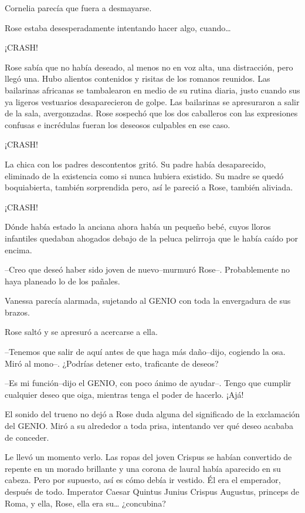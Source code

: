 Cornelia parecía que fuera a desmayarse.

Rose estaba desesperadamente intentando hacer algo, cuando\ldots{}

¡CRASH!

Rose sabía que no había deseado, al menos no en voz alta, una
distracción, pero llegó una. Hubo alientos contenidos y risitas de los
romanos reunidos. Las bailarinas africanas se tambalearon en medio de su
rutina diaria, justo cuando sus ya ligeros vestuarios desaparecieron de
golpe. Las bailarinas se apresuraron a salir de la sala, avergonzadas.
Rose sospechó que los dos caballeros con las expresiones confusas e
incrédulas fueran los deseosos culpables en ese caso.

¡CRASH!

La chica con los padres descontentos gritó. Su padre había desaparecido,
eliminado de la existencia como si nunca hubiera existido. Su madre se
quedó boquiabierta, también sorprendida pero, así le pareció a Rose,
también aliviada.

¡CRASH!

Dónde había estado la anciana ahora había un pequeño bebé, cuyos lloros
infantiles quedaban ahogados debajo de la peluca pelirroja que le había
caído por encima.

--Creo que deseó haber sido joven de nuevo--murmuró Rose--.
Probablemente no haya planeado lo de los pañales.

Vanessa parecía alarmada, sujetando al GENIO con toda la envergadura de
sus brazos.

Rose saltó y se apresuró a acercarse a ella.

--Tenemos que salir de aquí antes de que haga más daño--dijo, cogiendo
la osa. Miró al mono--. ¿Podrías detener esto, traficante de deseos?

--Es mi función--dijo el GENIO, con poco ánimo de ayudar--. Tengo que
cumplir cualquier deseo que oiga, mientras tenga el poder de hacerlo.
¡Ajá!

El sonido del trueno no dejó a Rose duda alguna del significado de la
exclamación del GENIO. Miró a su alrededor a toda prisa, intentando ver
qué deseo acababa de conceder.

Le llevó un momento verlo. Las ropas del joven Crispus se habían
convertido de repente en un morado brillante y una corona de laural
había aparecido en su cabeza. Pero por supuesto, así es cómo debía ir
vestido. Él era el emperador, después de todo. Imperator Caesar Quintus
Junius Crispus Augustus, princeps de Roma, y ella, Rose, ella era
su\ldots{} ¿concubina?

